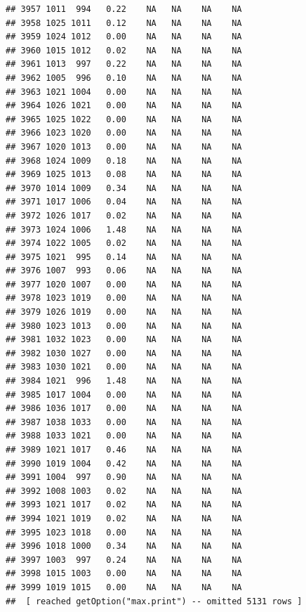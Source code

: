 \documentclass{article}\usepackage{graphicx, color}
\makeatletter
\newenvironment{kframe}{%
 \def\at@end@of@kframe{}%
 \ifinner\ifhmode%
  \def\at@end@of@kframe{\end{minipage}}%
  \begin{minipage}{\columnwidth}%
 \fi\fi%
 \def\FrameCommand##1{\hskip\@totalleftmargin \hskip-\fboxsep
 \colorbox{shadecolor}{##1}\hskip-\fboxsep
     \hskip-\linewidth \hskip-\@totalleftmargin \hskip\columnwidth}%
 \MakeFramed {\advance\hsize-\width
   \@totalleftmargin\z@ \linewidth\hsize
   \@setminipage}}%
 {\par\unskip\endMakeFramed%
 \at@end@of@kframe}
\newenvironment{knitrout}{}{} %
\makeatother
\begin{document}
\begin{knitrout}
\begin{kframe}
\begin{verbatim}
## 3957 1011  994   0.22    NA   NA    NA    NA
## 3958 1025 1011   0.12    NA   NA    NA    NA
## 3959 1024 1012   0.00    NA   NA    NA    NA
## 3960 1015 1012   0.02    NA   NA    NA    NA
## 3961 1013  997   0.22    NA   NA    NA    NA
## 3962 1005  996   0.10    NA   NA    NA    NA
## 3963 1021 1004   0.00    NA   NA    NA    NA
## 3964 1026 1021   0.00    NA   NA    NA    NA
## 3965 1025 1022   0.00    NA   NA    NA    NA
## 3966 1023 1020   0.00    NA   NA    NA    NA
## 3967 1020 1013   0.00    NA   NA    NA    NA
## 3968 1024 1009   0.18    NA   NA    NA    NA
## 3969 1025 1013   0.08    NA   NA    NA    NA
## 3970 1014 1009   0.34    NA   NA    NA    NA
## 3971 1017 1006   0.04    NA   NA    NA    NA
## 3972 1026 1017   0.02    NA   NA    NA    NA
## 3973 1024 1006   1.48    NA   NA    NA    NA
## 3974 1022 1005   0.02    NA   NA    NA    NA
## 3975 1021  995   0.14    NA   NA    NA    NA
## 3976 1007  993   0.06    NA   NA    NA    NA
## 3977 1020 1007   0.00    NA   NA    NA    NA
## 3978 1023 1019   0.00    NA   NA    NA    NA
## 3979 1026 1019   0.00    NA   NA    NA    NA
## 3980 1023 1013   0.00    NA   NA    NA    NA
## 3981 1032 1023   0.00    NA   NA    NA    NA
## 3982 1030 1027   0.00    NA   NA    NA    NA
## 3983 1030 1021   0.00    NA   NA    NA    NA
## 3984 1021  996   1.48    NA   NA    NA    NA
## 3985 1017 1004   0.00    NA   NA    NA    NA
## 3986 1036 1017   0.00    NA   NA    NA    NA
## 3987 1038 1033   0.00    NA   NA    NA    NA
## 3988 1033 1021   0.00    NA   NA    NA    NA
## 3989 1021 1017   0.46    NA   NA    NA    NA
## 3990 1019 1004   0.42    NA   NA    NA    NA
## 3991 1004  997   0.90    NA   NA    NA    NA
## 3992 1008 1003   0.02    NA   NA    NA    NA
## 3993 1021 1017   0.02    NA   NA    NA    NA
## 3994 1021 1019   0.02    NA   NA    NA    NA
## 3995 1023 1018   0.00    NA   NA    NA    NA
## 3996 1018 1000   0.34    NA   NA    NA    NA
## 3997 1003  997   0.24    NA   NA    NA    NA
## 3998 1015 1003   0.00    NA   NA    NA    NA
## 3999 1019 1015   0.00    NA   NA    NA    NA
##  [ reached getOption("max.print") -- omitted 5131 rows ]
\end{verbatim}
\end{kframe}
\end{knitrout}
\end{document}
